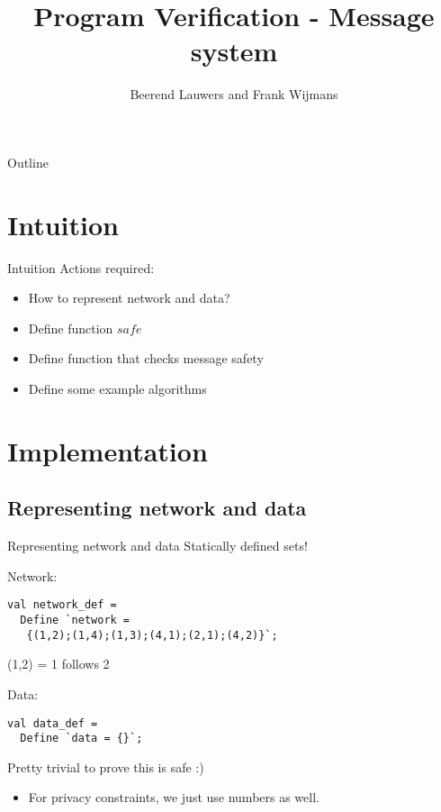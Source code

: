 \documentclass[10pt,a4paper]{beamer}
\author{Beerend Lauwers and Frank Wijmans}
\title{Program Verification - Message system}
\begin{document}
\frame{\maketitle}

\begin{frame}{Outline}
\tableofcontents
\end{frame}

\section{Intuition}

\begin{frame}{Intuition}
Actions required:
\begin{itemize}
\item How to represent network and data?
\item Define function $ safe $
\item Define function that checks message safety
\item Define some example algorithms
\end{itemize}
\end{frame}

\section{Implementation}

\subsection{Representing network and data}
\begin{frame}[fragile]{Representing network and data}
Statically defined sets!

Network:
\begin{lstlisting}
val network_def = 
  Define `network = 
   {(1,2);(1,4);(1,3);(4,1);(2,1);(4,2)}`;
\end{lstlisting}
(1,2) = 1 follows 2

Data:
\begin{lstlisting}
val data_def = 
  Define `data = {}`;
\end{lstlisting}
Pretty trivial to prove this is safe :)

\begin{itemize}
\item For privacy constraints, we just use numbers as well.
\end{itemize}
\end{frame}
\end{document}
